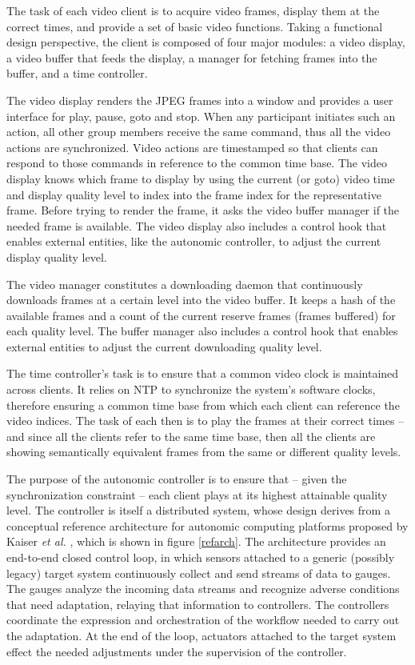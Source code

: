 \documentclass{sig-alternate}
\begin{document}

The task of each video client is to acquire video frames, display them
at the correct times, and provide a set of basic video functions.
Taking a functional design perspective, the client is composed of four
major modules: a video display, a video buffer that feeds the display,
a manager for fetching frames into the buffer, and a time controller.

The video display renders the JPEG frames into a window and provides a
user interface for play, pause, goto and stop.  When any participant
initiates such an action, all other group members receive the same
command, thus all the video actions are synchronized.  Video actions
are timestamped so that clients can respond to those commands in
reference to the common time base.  The video display knows which
frame to display by using the current (or goto) video time and display
quality level to index into the frame index for the representative
frame.  Before trying to render the frame, it asks the video buffer
manager if the needed frame is available.  The video display also
includes a control hook that enables external entities, like the
autonomic controller, to adjust the current display quality level.

The video manager constitutes a downloading daemon that continuously
downloads frames at a certain level into the video buffer.  It keeps a
hash of the available frames and a count of the current reserve frames
(frames buffered) for each quality level.  The buffer manager also
includes a control hook that enables external entities to adjust the
current downloading quality level.

The time controller's task is to ensure that a common video clock is
maintained across clients.  It relies on NTP to synchronize the
system's software clocks, therefore ensuring a common time base from
which each client can reference the video indices.  The task of each
then is to play the frames at their correct times -- and since all the
clients refer to the same time base, then all the clients are showing
semantically equivalent frames from the same or different quality
levels.


The purpose of the autonomic controller is to ensure that -- given the
synchronization constraint -- each client plays at its highest
attainable quality level.  The controller is itself a distributed
system, whose design derives from a conceptual reference architecture
for autonomic computing platforms proposed by Kaiser {\it et al.}
\cite{REFARCH}, which is shown in figure \ref{refarch}. The
architecture provides an end-to-end closed control loop, in which
sensors attached to a generic (possibly legacy) target system
continuously collect and send streams of data to gauges.  The gauges
analyze the incoming data streams and recognize adverse conditions
that need adaptation, relaying that information to controllers.  The
controllers coordinate the expression and orchestration of the
workflow needed to carry out the adaptation.  At the end of the loop,
actuators attached to the target system effect the needed adjustments
under the supervision of the controller.
\end{document}
